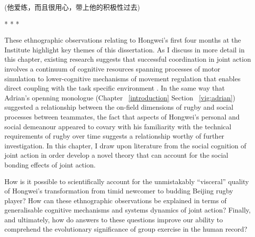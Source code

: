 \begin{CJK}{UTF8}{gbsn}
(他爱练，而且很用心，带上他的积极性过去)


                          \begin{center}
                            * * *
                          \end{center}



These ethnographic observations relating to Hongwei's first four months at the Institute highlight key themes of this dissertation.  As I discuss in more detail in this chapter, existing research suggests that successful coordination in joint action involves a continuum of cognitive resources spanning processes of motor simulation to lower-cognitive mechanisms of movement regulation that enables direct coupling with the task specific environment  \citep{Sebanz2006,Vesper2017,Pesquita2017}.  In the same way that Adrian's openning monologue (Chapter ~\ref{introduction} Section ~\ref{vig:adrian}) suggested a relationship between the on-field dimensions of rugby and social processes between teammates, the fact that aspects of Hongwei's personal and social demeanour appeared to covary with his familiarity with the technical requirements of rugby over time suggests a relationship worthy of further investigation.  In this chapter, I draw upon literature from the social cognition of joint action in order develop a novel theory that can account for the social bonding effects of joint action.

How is it possible to scientifically account for the unmistakably ``visceral'' quality of Hongwei's transformation from timid newcomer to budding Beijing rugby player?  How can these ethnographic observations be explained in terms of generalisable cognitive mechanisms and systems dynamics of joint action?  Finally, and ultimately, how do answers to these questions improve our ability to comprehend the evolutionary significance of group exercise in the human record?





\end{CJK}
